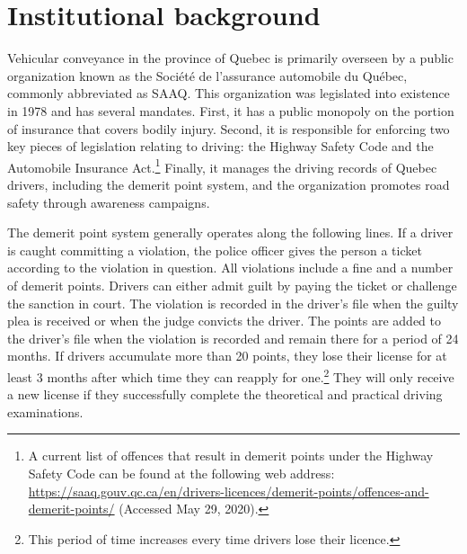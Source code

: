 \section{Institutional background}
\label{sec:Background}

Vehicular conveyance in the province of Quebec is primarily overseen by 
a public organization known as the Soci\'{e}t\'{e} de l'assurance automobile du Qu\'{e}bec, 
commonly abbreviated as SAAQ. 
This organization was legislated into existence in 1978 and has several mandates. 
First, it has a public monopoly on the portion of insurance that covers bodily injury. 
Second, it is responsible for enforcing two key pieces of legislation relating to driving: 
the Highway Safety Code and the Automobile Insurance Act.\footnote{%
%
A current list of offences that result in demerit points under the Highway Safety Code 
can be found at the following web address: 
\url{https://saaq.gouv.qc.ca/en/drivers-licences/demerit-points/offences-and-demerit-points/} (Accessed May 29, 2020).}
%
Finally, it manages the driving records of Quebec drivers, 
including the demerit point system, 
and the organization promotes road safety through awareness campaigns.

The demerit point system generally operates along the following lines. 
If a driver is caught committing a violation, the police officer 
gives the person a ticket according to the violation in question. 
All violations include a fine and a number of demerit points. 
Drivers can either admit guilt by paying the ticket or challenge the sanction in court. 
The violation is recorded in the driver’s file when the guilty plea is received 
or when the judge convicts the driver. 
The points are added to the driver’s file when the violation is recorded 
and remain there for a period of 24 months. 
If drivers accumulate more than 20 points, they lose their license for at least 3 months after which time they can reapply for one.\footnote{%
%
This period of time increases every time drivers lose their licence.}
%
They will only receive a new license if they successfully complete 
the theoretical and practical driving examinations.




